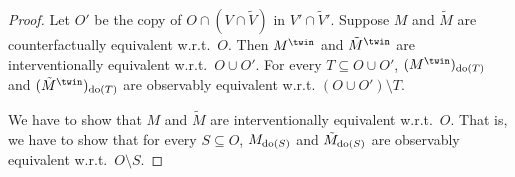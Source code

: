 \begin{proof}
%
  Let $O'$ be the copy of $O \cap (V \cap \tilde{V})$ in $V' \cap \tilde{V}'$.
    Suppose $M$ and $\tilde{M}$ are counterfactually equivalent w.r.t.\ $O$. 
    Then $M^\twin$ and $\tilde{M}^\twin$ are interventionally equivalent w.r.t.\ $O \cup O'$. 
  For every $T \subseteq O \cup O'$,
  $(M^\twin)_{\doit(T)}$ and $(\tilde{M}^\twin)_{\doit(T)}$ are observably equivalent w.r.t. $(O \cup O') \setminus T$.

  We have to show that $M$ and $\tilde{M}$ are interventionally equivalent w.r.t.\ $O$.
  That is, we have to show that for every $S \subseteq O$, $M_{\operatorname{do}(S)}$ and $\tilde{M}_{\operatorname{do}(S)}$
  are observably equivalent w.r.t.\ $O \setminus S$.



\end{proof}
